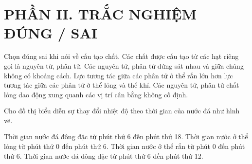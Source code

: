 
\section*{PHẦN II. TRẮC NGHIỆM ĐÚNG / SAI}


\begin{ex}
Chọn đúng sai khi nói về cấu tạo chất.
\choiceTF
{\True Các chất được cấu tạo từ các hạt riêng gọi là nguyên tử, phân tử.}
{Các nguyên tử, phân tử đứng sát nhau và giữa chúng không có khoảng cách.}
{\True Lực tương tác giữa các phân tử ở thể rắn lớn hơn lực tương tác giữa các phân tử ở thể lỏng và thể khí.}
{\True Các nguyên tử, phân tử chất lỏng dao động xung quanh các vị trí cân bằng không cố định.}
\end{ex}


\begin{ex}
Cho đồ thị biểu diễn sự thay đổi nhiệt độ theo thời gian của nước đá như hình vẽ.

\begin{center}
\end{center}

\choiceTF
{Thời gian nước đá đông đặc từ phút thứ 6 đến phút thứ 18.}
{\True Thời gian nước ở thể lỏng từ phút thứ 0 đến phút thứ 6.}
{Thời gian nước ở thể rắn từ phút 0 đến phút thứ 6.}
{\True Thời gian nước đá đông đặc từ phút thứ 6 đến phút thứ 12.}
\end{ex}



